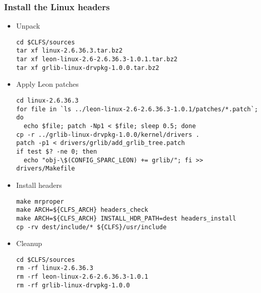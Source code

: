  \subsubsection{Install the Linux headers}
 \begin{itemize}
  \item Unpack
    \begin{lstlisting}
cd $CLFS/sources
tar xf linux-2.6.36.3.tar.bz2
tar xf leon-linux-2.6-2.6.36.3-1.0.1.tar.bz2
tar xf grlib-linux-drvpkg-1.0.0.tar.bz2
    \end{lstlisting}
  \item Apply Leon patches
    \begin{lstlisting}
cd linux-2.6.36.3
for file in `ls ../leon-linux-2.6-2.6.36.3-1.0.1/patches/*.patch`; do
  echo $file; patch -Np1 < $file; sleep 0.5; done
cp -r ../grlib-linux-drvpkg-1.0.0/kernel/drivers .
patch -p1 < drivers/grlib/add_grlib_tree.patch
if test $? -ne 0; then
  echo "obj-\$(CONFIG_SPARC_LEON) += grlib/"; fi >> drivers/Makefile
    \end{lstlisting}
  \item Install headers
    \begin{lstlisting}
make mrproper
make ARCH=${CLFS_ARCH} headers_check
make ARCH=${CLFS_ARCH} INSTALL_HDR_PATH=dest headers_install
cp -rv dest/include/* ${CLFS}/usr/include
    \end{lstlisting}
  \item Cleanup
    \begin{lstlisting}
cd $CLFS/sources
rm -rf linux-2.6.36.3
rm -rf leon-linux-2.6-2.6.36.3-1.0.1
rm -rf grlib-linux-drvpkg-1.0.0
    \end{lstlisting}
 \end{itemize}

